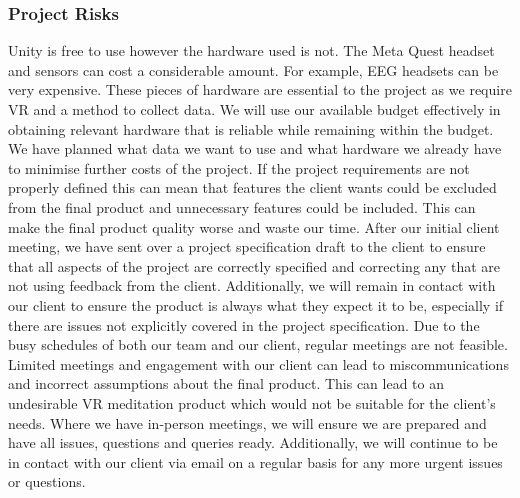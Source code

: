 \documentclass[coverpage,lineno]{../custom}
\begin{document}
\subsubsection{Project Risks}
{Unity is free to use however the hardware used is not. The Meta Quest headset and sensors can cost a considerable amount. For example, EEG headsets can be very expensive. These pieces of hardware are essential to the project as we require VR and a method to collect data.}
{We will use our available budget effectively in obtaining relevant hardware that is reliable while remaining within the budget. We have planned what data we want to use and what hardware we already have to minimise further costs of the project.}
{If the project requirements are not properly defined this can mean that features the client wants could be excluded from the final product and unnecessary features could be included. This can make the final product quality worse and waste our time.}
{After our initial client meeting, we have sent over a project specification draft to the client to ensure that all aspects of the project are correctly specified and correcting any that are not using feedback from the client. Additionally, we will remain in contact with our client to ensure the product is always what they expect it to be, especially if there are issues not explicitly covered in the project specification.}
{Due to the busy schedules of both our team and our client, regular meetings are not feasible. Limited meetings and engagement with our client can lead to miscommunications and incorrect assumptions about the final product. This can lead to an undesirable VR meditation product which would not be suitable for the client’s needs.}
{Where we have in-person meetings, we will ensure we are prepared and have all issues, questions and queries ready. Additionally, we will continue to be in contact with our client via email on a regular basis for any more urgent issues or questions.}
\end{document}
